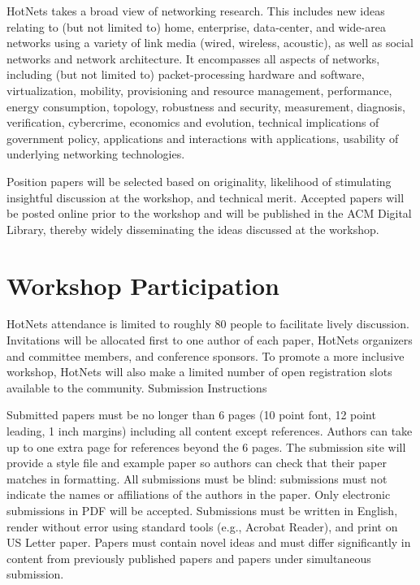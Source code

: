 \documentclass{hotnets15}
\begin{document}
HotNets takes a broad view of networking research. This includes new
ideas relating to (but not limited to) home, enterprise, data-center,
and wide-area networks using a variety of link media (wired, wireless,
acoustic), as well as social networks and network architecture. It
encompasses all aspects of networks, including (but not limited to)
packet-processing hardware and software, virtualization, mobility,
provisioning and resource management, performance, energy consumption,
topology, robustness and security, measurement, diagnosis,
verification, cybercrime, economics and evolution, technical
implications of government policy, applications and interactions with
applications, usability of underlying networking technologies.

Position papers will be selected based on originality, likelihood of
stimulating insightful discussion at the workshop, and technical
merit. Accepted papers will be posted online prior to the workshop and
will be published in the ACM Digital Library, thereby widely
disseminating the ideas discussed at the workshop.

\section{Workshop Participation}

HotNets attendance is limited to roughly 80 people to facilitate
lively discussion. Invitations will be allocated first to one author
of each paper, HotNets organizers and committee members, and
conference sponsors. To promote a more inclusive workshop, HotNets
will also make a limited number of open registration slots available
to the community.  Submission Instructions

Submitted papers must be no longer than 6 pages (10 point font, 12
point leading, 1 inch margins) including all content except
references. Authors can take up to one extra page for references
beyond the 6 pages. The submission site will provide a style file and
example paper so authors can check that their paper matches in
formatting. All submissions must be blind: submissions must not
indicate the names or affiliations of the authors in the paper. Only
electronic submissions in PDF will be accepted. Submissions must be
written in English, render without error using standard tools (e.g.,
Acrobat Reader), and print on US Letter paper. Papers must contain
novel ideas and must differ significantly in content from previously
published papers and papers under simultaneous submission.
\end{document}
